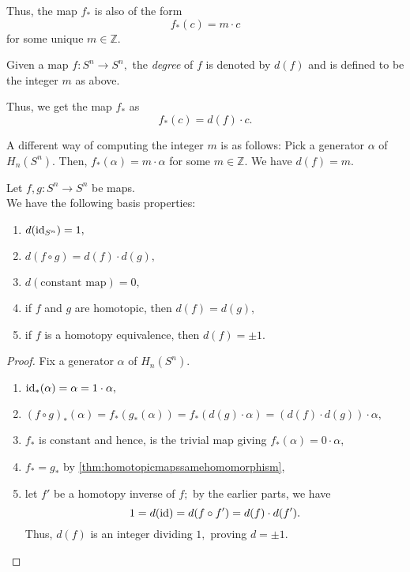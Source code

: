 \documentclass[12pt]{article}
\begin{document}
Thus, the map $f_*$ is also of the form
\begin{equation*} 
	f_*(c) = m\cdot c
\end{equation*}
for some unique $m \in \mathbb{Z}.$

\begin{defn}
	Given a map $f:S^n\to S^n,$ the \emph{degree} of $f$ is denoted by $d(f)$ and is defined to be the integer $m$ as above.
\end{defn}

Thus, we get the map $f_*$ as
\begin{equation*} 
	f_*(c) = d(f)\cdot c.
\end{equation*}

A different way of computing the integer $m$ is as follows: Pick a generator $\alpha$ of $H_n(S^n).$ Then, $f_*(\alpha) = m\cdot\alpha$ for some $m \in \mathbb{Z}.$ We have $d(f) = m.$

\begin{prop}
	Let $f, g:S^n \to S^n$ be maps.\\
	We have the following basis properties:
	\begin{enumerate}
		\item $d(\operatorname{id}_{S^n}) = 1,$
		\item $d(f\circ g) = d(f)\cdot d(g),$
		\item $d(\text{constant map}) = 0,$
		\item if $f$ and $g$ are homotopic, then $d(f) = d(g),$
		\item if $f$ is a homotopy equivalence, then $d(f) = \pm 1.$
	\end{enumerate}
\end{prop}
\begin{proof} 
	Fix a generator $\alpha$ of $H_n(S^n).$
	\begin{enumerate}
		\item $\operatorname{id}_*(\alpha) = \alpha = 1\cdot\alpha,$
		\item $(f\circ g)_*(\alpha) = f_*(g_*(\alpha)) = f_*(d(g)\cdot\alpha) = (d(f)\cdot d(g))\cdot\alpha,$
		\item $f_*$ is constant and hence, is the trivial map giving $f_*(\alpha) = 0\cdot\alpha,$
		\item $f_* = g_*$ by \cref{thm:homotopicmapssamehomomorphism},
		\item let $f'$ be a homotopy inverse of $f;$ by the earlier parts, we have 
		\begin{equation*} 
			1 = d(\operatorname{id}) = d(f\circ f') = d(f)\cdot d(f').
		\end{equation*} Thus, $d(f)$ is an integer dividing $1,$ proving $d = \pm 1.$ \qedhere
	\end{enumerate}
\end{proof}
\end{document}
